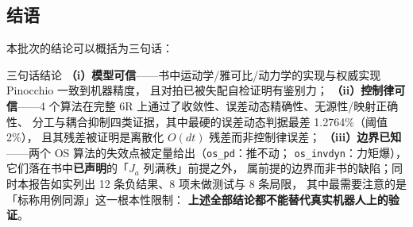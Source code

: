 \documentclass[11pt,a4paper]{ctexart}
\begin{document}
\begin{table}[H]
\centering
\small
\setlength{\tabcolsep}{4pt}
\caption{后续批次需要补齐的接口}\label{tab:gaps}
\end{table}

\subsection{结语}

本批次的结论可以概括为三句话：

\begin{keybox}{三句话结论}
\textbf{（i）模型可信}——书中运动学/雅可比/动力学的实现与权威实现 Pinocchio 一致到机器精度，
且对拍已被失配自检证明有鉴别力；
\textbf{（ii）控制律可信}——4 个算法在完整 6R 上通过了收敛性、误差动态精确性、无源性/映射正确性、
分工与耦合抑制四类证据，其中最硬的误差动态判据最差 1.2764\%（阈值 2\%），
且其残差被证明是离散化 $O(dt)$ 残差而非控制律误差；
\textbf{（iii）边界已知}——两个 OS 算法的失效点被定量给出（\texttt{os\_pd}：推不动；
\texttt{os\_invdyn}：力矩爆），它们落在书中\textbf{已声明}的「$J_a$ 列满秩」前提之外，
属前提的边界而非书的缺陷；同时本报告如实列出 12 条负结果、8 项未做测试与 8 条局限，
其中最需要注意的是「标称用例同源」这一根本性限制：
\textbf{上述全部结论都不能替代真实机器人上的验证}。
\end{keybox}

\clearpage
\appendix

\end{document}
